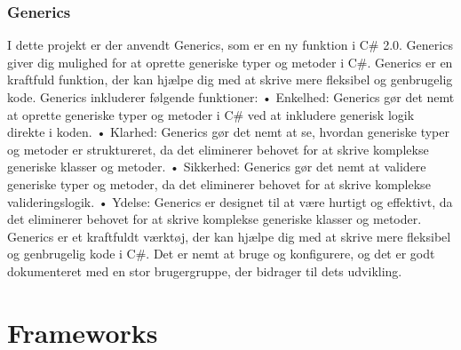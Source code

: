 \subsubsection{Generics}
I dette projekt er der anvendt Generics, som er en ny funktion i C\# 2.0. Generics giver dig mulighed for at oprette generiske typer og metoder i C\#. Generics er en kraftfuld funktion, der kan hjælpe dig med at skrive mere fleksibel og genbrugelig kode.
Generics inkluderer følgende funktioner:
•	Enkelhed: Generics gør det nemt at oprette generiske typer og metoder i C\# ved at inkludere generisk logik direkte i koden.
•	Klarhed: Generics gør det nemt at se, hvordan generiske typer og metoder er struktureret, da det eliminerer behovet for at skrive komplekse generiske klasser og metoder.
•	Sikkerhed: Generics gør det nemt at validere generiske typer og metoder, da det eliminerer behovet for at skrive komplekse valideringslogik.
•	Ydelse: Generics er designet til at være hurtigt og effektivt, da det eliminerer behovet for at skrive komplekse generiske klasser og metoder.
Generics er et kraftfuldt værktøj, der kan hjælpe dig med at skrive mere fleksibel og genbrugelig kode i C\#. Det er nemt at bruge og konfigurere, og det er godt dokumenteret med en stor brugergruppe, der bidrager til dets udvikling.

\section{Frameworks}


